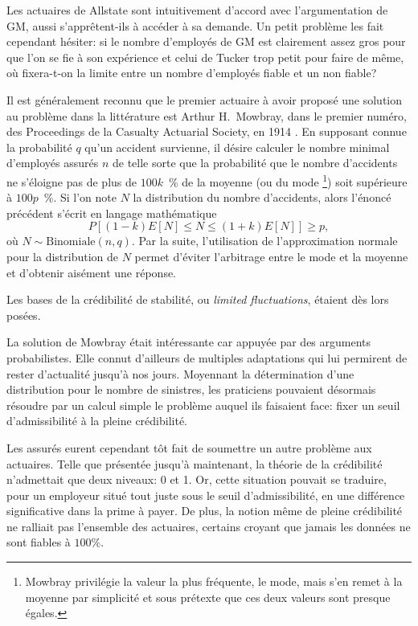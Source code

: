Les actuaires de Allstate sont intuitivement d'accord avec
l'argumentation de GM, aussi s'apprêtent-ils à accéder à sa demande.
Un petit problème les fait cependant hésiter: si le nombre d'employés
de GM est clairement assez gros pour que l'on se fie à son expérience
et celui de Tucker trop petit pour faire de même, où fixera-t-on la
limite entre un nombre d'employés fiable et un non fiable?

Il est généralement reconnu que le premier actuaire à avoir proposé
une solution au problème dans la littérature est Arthur H.\ Mowbray,
dans le premier numéro, des Proceedings de la Casualty Actuarial
Society, en 1914 \citep{Mowbray:1914}. En supposant connue la
probabilité $q$ qu'un accident survienne, il désire calculer le nombre
minimal d'employés assurés $n$ de telle sorte que la probabilité que
le nombre d'accidents ne s'éloigne pas de plus de $100k$~\% de la
moyenne (ou du mode%
\footnote{Mowbray privilégie la valeur la plus fréquente, le mode,
  mais s'en remet à la moyenne par simplicité et sous prétexte que ces
  deux valeurs sont presque égales.}) %
soit supérieure à $100p$~\%. Si l'on note $N$ la distribution du
nombre d'accidents, alors l'énoncé précédent s'écrit en langage
mathématique
\begin{equation*}
  P \left[ (1 - k)E[N] \leq N \leq (1 + k)E[N] \right] \geq p,
\end{equation*}
où $N \sim \text{Binomiale}(n, q)$. Par la suite, l'utilisation de
l'approximation normale pour la distribution de $N$ permet d'éviter
l'arbitrage entre le mode et la moyenne et d'obtenir aisément une
réponse.

Les bases de la crédibilité de stabilité, ou \emph{limited
  fluctuations}, étaient dès lors posées.

La solution de Mowbray était intéressante car appuyée par des
arguments probabilistes. Elle connut d'ailleurs de multiples
adaptations qui lui permirent de rester d'actualité jusqu'à nos jours.
Moyennant la détermination d'une distribution pour le nombre de
sinistres, les praticiens pouvaient désormais résoudre par un calcul
simple le problème auquel ils faisaient face: fixer un seuil
d'admissibilité à la pleine crédibilité.

Les assurés eurent cependant tôt fait de soumettre un autre problème
aux actuaires. Telle que présentée jusqu'à maintenant, la théorie de
la crédibilité n'admettait que deux niveaux: 0 et 1. Or, cette
situation pouvait se traduire, pour un employeur situé tout juste sous
le seuil d'admissibilité, en une différence significative dans la
prime à payer. De plus, la notion même de pleine crédibilité ne
ralliait pas l'ensemble des actuaires, certains croyant que jamais les
données ne sont fiables à $100\%$.

